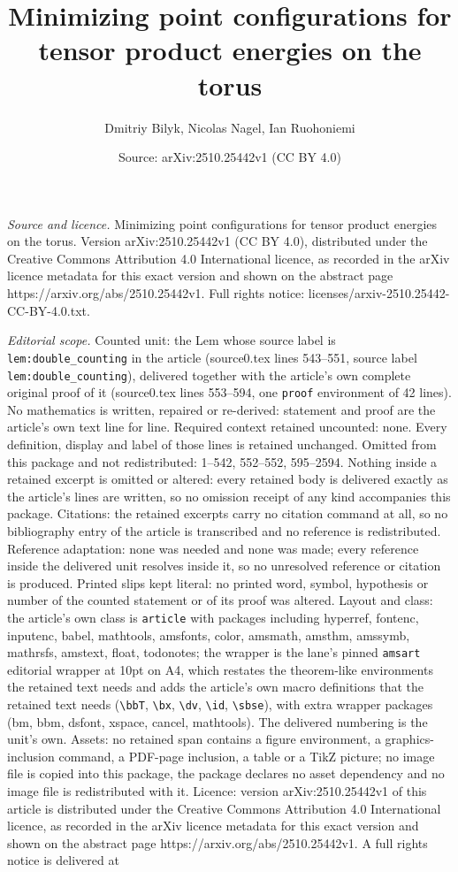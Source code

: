 \documentclass[10pt,a4paper]{amsart}
\title[Minimizing point configurations for tensor product energies ]{Minimizing point configurations for tensor product energies on the torus}
\author{Dmitriy Bilyk, Nicolas Nagel, Ian Ruohoniemi}
\date{Source: arXiv:2510.25442v1 (CC BY 4.0)}
\begin{document}
\maketitle

\noindent\emph{Source and licence.} Minimizing point configurations for tensor product energies on the torus. Version arXiv:2510.25442v1 (CC BY 4.0), distributed under the Creative Commons Attribution 4.0 International licence, as recorded in the arXiv licence metadata for this exact version and shown on the abstract page https://arxiv.org/abs/2510.25442v1. Full rights notice: licenses/arxiv-2510.25442-CC-BY-4.0.txt.\par\smallskip

\noindent\textit{Editorial scope.} Counted unit: the Lem whose source label is \texttt{lem:double\_counting} in the article (source0.tex lines 543--551, source label \texttt{lem:double\_counting}), delivered together with the article's own complete original proof of it (source0.tex lines 553--594, one \texttt{proof} environment of 42 lines). No mathematics is written, repaired or re-derived: statement and proof are the article's own text line for line. Required context retained uncounted: none. Every definition, display and label of those lines is retained unchanged. Omitted from this package and not redistributed: 1--542, 552--552, 595--2594. Nothing inside a retained excerpt is omitted or altered: every retained body is delivered exactly as the article's lines are written, so no omission receipt of any kind accompanies this package. Citations: the retained excerpts carry no citation command at all, so no bibliography entry of the article is transcribed and no reference is redistributed. Reference adaptation: none was needed and none was made; every reference inside the delivered unit resolves inside it, so no unresolved reference or citation is produced. Printed slips kept literal: no printed word, symbol, hypothesis or number of the counted statement or of its proof was altered. Layout and class: the article's own class is \texttt{article} with packages including hyperref, fontenc, inputenc, babel, mathtools, amsfonts, color, amsmath, amsthm, amssymb, mathrsfs, amstext, float, todonotes; the wrapper is the lane's pinned \texttt{amsart} editorial wrapper at 10pt on A4, which restates the theorem-like environments the retained text needs and adds the article's own macro definitions that the retained text needs (\texttt{\textbackslash bbT}, \texttt{\textbackslash bx}, \texttt{\textbackslash dv}, \texttt{\textbackslash id}, \texttt{\textbackslash sbse}), with extra wrapper packages (bm, bbm, dsfont, xspace, cancel, mathtools). The delivered numbering is the unit's own. Assets: no retained span contains a figure environment, a graphics-inclusion command, a PDF-page inclusion, a table or a TikZ picture; no image file is copied into this package, the package declares no asset dependency and no image file is redistributed with it. Licence: version arXiv:2510.25442v1 of this article is distributed under the Creative Commons Attribution 4.0 International licence, as recorded in the arXiv licence metadata for this exact version and shown on the abstract page https://arxiv.org/abs/2510.25442v1. A full rights notice is delivered at 
\end{document}
